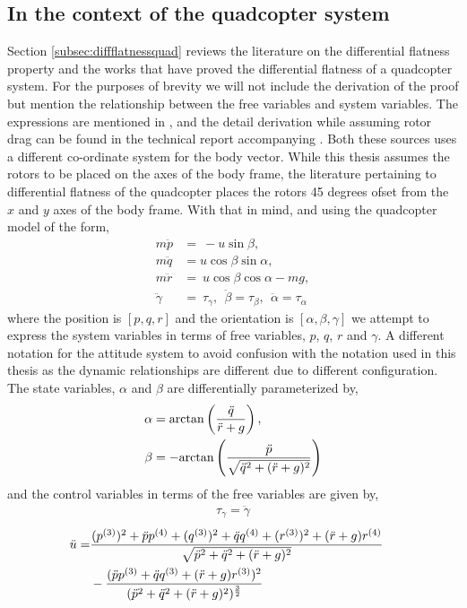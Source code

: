 \documentclass[letterpaper%
, twoside%
, 12pt%
,memoire%
, english%
,creativecommons,hyperref%
]{thETS}
\theoremstyle{newThmStyle}
\begin{document}
\subsection{In the context of the quadcopter system}
Section \ref{subsec:diffflatnessquad} reviews the literature on the differential flatness property and the works that have proved the differential flatness of a quadcopter system. For the purposes of brevity we will not include the derivation of the proof but mention the relationship between the free variables and system variables. The expressions are mentioned in \citep{RN81}, and the detail derivation while assuming rotor drag can be found in the technical report accompanying \citep{faessler2017differential}. Both these sources uses a different co-ordinate system for the body vector. While this thesis assumes the rotors to be placed on the axes of the body frame, the literature pertaining to differential flatness of the quadcopter places the rotors 45 degrees ofset from the $x$ and $y$ axes of the body frame. With that in mind, and using the quadcopter model of the form, 
\begin{align}
m\ddot{p} &=\ -u\sin\beta, \\
m\ddot{q} &=u\cos\beta\sin\alpha, \\
m\ddot{r} &=\ u\cos\beta\cos\alpha-mg, \\
\ddot{\gamma} &=\ \tau_{\gamma},\ \ \ddot{\beta}=\tau_{\beta}, \ \ \ddot{\alpha}=\tau_{\alpha}
\end{align}
where the position is $[p,q,r]$ and the orientation is $[\alpha, \beta,\gamma]$ we attempt to express the system variables in terms of free variables, $p$, $q$, $r$ and $\gamma$. A different notation for the attitude system to avoid confusion with the notation used in this thesis as the dynamic relationships are different due to different configuration. The state variables, $\alpha$ and $\beta$ are differentially parameterized by, 
\begin{align*}
\alpha &= {\rm arctan} \left({\ddot{q}\over \ddot{r}+g}\right),\\
\beta &= -{\rm arctan} \left({\ddot{p}\over \sqrt{\ddot{q}^{2}+(\ddot{r}+g)^{2}}}\right)
\end{align*} and the control variables in terms of the free variables are given by,
\begin{align} \label{eqn:taupsi}
\tau_{\gamma}=\ddot{\gamma}
\end{align} 
\begin{align} 
\ddot{u} =& {(p^{(3)})^{2}+\ddot{p}p^{(4)}+(q^{(3)})^{2}+\ddot{q}q^{(4)}+(r^{(3)})^{2}+(\ddot{r}+g)r^{(4)}\over \sqrt{\ddot{p}^{2}+\ddot{q}^{2}+(\ddot{r}+g)^{2}}}\cr &-{(\ddot{p}p^{(3)}+\ddot{q}q^{(3)}+(\ddot{r}+g)r^{(3)})^{2}\over (\ddot{p}^{{2}}+\ddot{q}^{{2}}+(\ddot{r}+g)^{2})^{{3\over 2}}}
\end{align}
\end{document}
